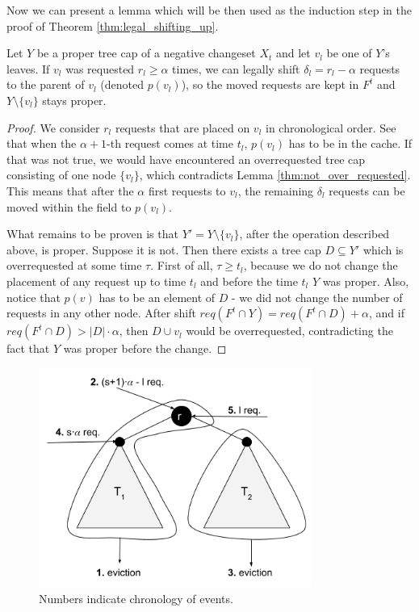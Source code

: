 Now we can present a lemma which will be then used as the induction step in the
proof of Theorem \ref{thm:legal_shifting_up}.
\begin{lemma} Let $Y$ be a proper
tree cap of a negative changeset $X_t$ and let $v_l$ be one of $Y$'s leaves. If
$v_l$ was requested $r_l \geq \alpha$ times, we can legally shift  $\delta_l =
r_l - \alpha$ requests to the parent of $v_l$ (denoted $p(v_l)$), so the moved
requests are kept in $F^t$ and $Y \setminus \{v_l\}$ stays proper.
\end{lemma}
\begin{proof}
We consider $r_l$ requests that are placed on $v_l$ in
chronological order. See that when the $\alpha + 1$-th request comes at time
$t_l$, $p(v_l)$ has to be in the cache. If that was not true, we would have
encountered an overrequested tree cap consisting of one node $\{v_l\}$, which
contradicts Lemma \ref{thm:not_over_requested}. This means that after the $\alpha$
first requests to $v_l$, the remaining $\delta_l$ requests can be moved within 
the field to $p(v_l)$.

What remains to be proven is that $Y' = Y \setminus \{v_l\}$, after the operation
described above, is proper. Suppose it is not. Then there exists a tree cap $D
\subseteq Y'$ which is overrequested at some time $\tau$. First of all, $\tau
\geq t_l$, because we do not change the placement of any request up to time $t_l$
and before the time $t_l$ $Y$ was proper. Also, notice that $p(v)$ has to be an
element of $D$ - we did not change the number of requests in any other node.
After shift $req(F^t \cap Y) = req(F^t \cap D) + \alpha$, and if $req(F^t \cap
D) > |D| \cdot \alpha$, then $D \cup v_l$ would be overrequested, contradicting
the fact that $Y$ was proper before the change.
\end{proof}
\begin{figure}
\begin{center} \includegraphics[width=0.8\textwidth]{example_not_even.png}
\end{center} \caption{Numbers indicate chronology of events.}
\label{fig:example_not_even} \end{figure}

